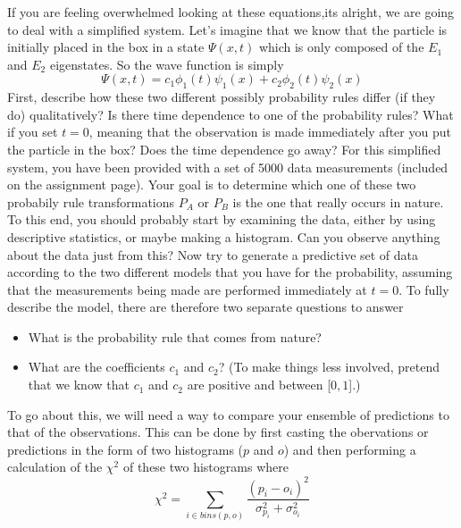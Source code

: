 \documentclass[12pt]{article}
\begin{document}
If you are feeling overwhelmed looking at these equations,its alright, we are going to deal with a simplified system.  Let's imagine that we know that the particle is initially placed in the box in a state $\Psi(x,t)$ which is only composed of the $E_1$ and $E_2$ eigenstates.  So the wave function is simply 
\begin{displaymath}
\Psi(x,t)=c_{1}\phi_{1}(t)\psi_{1}(x)+c_{2}\phi_{2}(t)\psi_{2}(x)
\end{displaymath}
First, describe how these two different possibly probability rules differ (if they do) qualitatively?  Is there time dependence to one of the probability rules?  What if you set $t=$0, meaning that the observation is made immediately after you put the particle in the box?  Does the time dependence go away?
\newline
\newline
For this simplified system, you have been provided with a set of 5000 data measurements (included on the assignment page).  Your goal is to determine which one of these two probabily rule transformations $P_{A}$ or $P_{B}$ is the one that really occurs in nature.  To this end, you should probably start by examining the data, either by using descriptive statistics, or maybe making a histogram.  Can you observe anything about the data just from this?  Now try to generate a predictive set of data according to the two different models that you have for the probability, assuming that the measurements being made are performed immediately at $t=$0.  
\newline
\newline
To fully describe the model, there are therefore two separate questions to answer
\begin{itemize}[noitemsep]
\item What is the probability rule that comes from nature?
\item What are the coefficients $c_1$ and $c_2$? (To make things less involved, pretend that we know that $c_1$ and $c_2$ are positive and between [$0,1$].)
\end{itemize}
To go about this, we will need a way to compare your ensemble of predictions to that of the observations.  This can be done by first casting the obervations or predictions in the form of two histograms ($p$ and $o$) and then performing a calculation of the $\chi^{2}$ of these two histograms where
\begin{displaymath}
\chi^{2}=\displaystyle\sum_{i \in bins(p,o)} \frac{(p_{i}-o_{i})^2}{\sigma_{p_{i}}^{2}+\sigma_{o_{i}}^{2}}
\end{displaymath}
\end{document}
